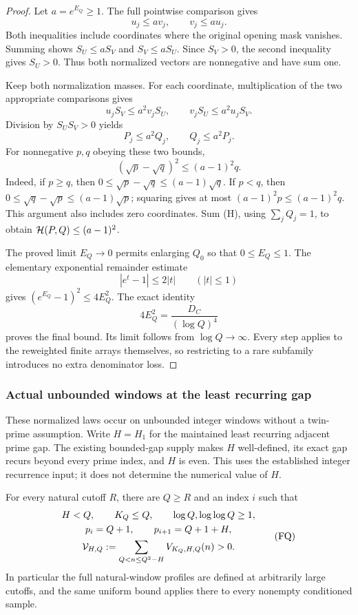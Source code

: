 \documentclass[11pt]{article}
\begin{document}
\begin{proof}
Let \(a=e^{E_Q}\geq1\). The full pointwise comparison gives
\[
                         u_j\leq av_j,\qquad v_j\leq au_j.
\]
Both inequalities include coordinates where the original opening
mask vanishes. Summing shows
\(S_U\leq aS_V\) and \(S_V\leq aS_U\).
Since \(S_V>0\), the second inequality gives \(S_U>0\).
Thus both normalized vectors are nonnegative and have sum one.

Keep both normalization masses. For each coordinate, multiplication
of the two appropriate comparisons gives
\[
 u_jS_V\leq a^2v_jS_U,\qquad
 v_jS_U\leq a^2u_jS_V.
\]
Division by \(S_US_V>0\) yields
\[
                              P_j\leq a^2Q_j,\qquad Q_j\leq a^2P_j.
\]
For nonnegative \(p,q\) obeying these two bounds,
\[
                       (\sqrt p-\sqrt q)^2\leq(a-1)^2q.
 \tag{H}
\]
Indeed, if \(p\geq q\), then
\(0\leq\sqrt p-\sqrt q\leq(a-1)\sqrt q\).
If \(p<q\), then
\(0\leq\sqrt q-\sqrt p\leq(a-1)\sqrt p\);
squaring gives at most \((a-1)^2p\leq(a-1)^2q\).
This argument also includes zero coordinates.
Sum (H), using \(\sum_jQ_j=1\), to obtain
\({\cal H}(P,Q)\leq(a-1)^2\).

The proved limit \(E_Q\to0\) permits enlarging \(Q_0\) so that
\(0\leq E_Q\leq1\). The elementary exponential remainder estimate
\[
                         |e^t-1|\leq2|t|\qquad(|t|\leq1)
\]
gives \((e^{E_Q}-1)^2\leq4E_Q^2\).
The exact identity
\[
                   4E_Q^2=\frac{D_C}{(\log Q)^4}
\]
proves the final bound. Its limit follows from \(\log Q\to\infty\).
Every step applies to the reweighted finite arrays themselves, so
restricting to a rare subfamily introduces no extra denominator loss.
\end{proof}

\subsubsection{Actual unbounded windows at the least recurring gap}
These normalized laws occur on unbounded integer windows without a
twin-prime assumption. Write \(H=H_1\) for the maintained least
recurring adjacent prime gap. The existing bounded-gap supply makes
\(H\) well-defined, its exact gap recurs beyond every prime index,
and \(H\) is even. This uses the established integer recurrence
input; it does not determine the numerical value of \(H\).

For every natural cutoff \(R\), there are \(Q\geq R\) and an index
\(i\) such that
\[
 \begin{gathered}
 H<Q,\qquad K_Q\leq Q,\qquad \log Q,\log\log Q\geq1,\\
 p_i=Q+1,\qquad p_{i+1}=Q+1+H,\\
 {\cal V}_{H,Q}:=
       \sum_{Q<n\leq Q^2-H}V_{K_Q,H,Q}(n)>0.
 \end{gathered}
 \tag{FQ}
\]
In particular the full natural-window profiles are defined at
arbitrarily large cutoffs, and the same uniform bound applies
there to every nonempty conditioned sample.
\end{document}
